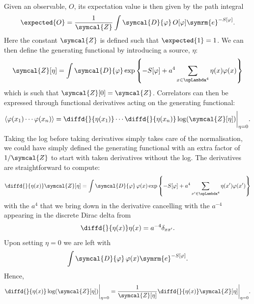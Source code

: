 \documentclass[fleqn]{NotesClass}
\newcommand{\e}{\symrm{e}}
\newcommand{\DL}[1]{\symcal{D}{#1}}
\DeclarePairedDelimiter{\correlator}{\langle}{\rangle}
\newcommand{\partitionFunction}{\symcal{Z}}
\newcommand{\lattice}[1][4]{\upLambda^{#1}}
\begin{document}
    Given an observable, \(O\), its expectation value is then given by the path integral
    \begin{equation}
        \expected{O} = \frac{1}{\partitionFunction} \int \DL{\varphi} \, O[\varphi] \e^{-S[\varphi]}.
    \end{equation}
    Here the constant \(\partitionFunction\) is defined such that \(\expected{1} = 1\).
    We can then define the generating functional by introducing a source, \(\eta\):
    \begin{equation}
        \partitionFunction[\eta] = \int \DL{\varphi} \exp\left\{ -S[\varphi] + a^4 \sum_{x\in\lattice} \eta(x)\varphi(x) \right\}
    \end{equation}
    which is such that \(\partitionFunction[0] = \partitionFunction\).
    Correlators can then be expressed through functional derivatives acting on the generating functional:
    \begin{equation}
        \correlator{\varphi(x_1) \dotsm \varphi(x_n)} = \diffd{}{\eta(x_1)} \dotsm \diffd{}{\eta(x_n)} \log(\partitionFunction[\eta])\bigg|_{\eta = 0}.
    \end{equation}
    Taking the log before taking derivatives simply takes care of the normalisation, we could have simply defined the generating functional with an extra factor of \(1/\partitionFunction\) to start with taken derivatives without the log.
    The derivatives are straightforward to compute:
    \begin{equation}
        \diffd{}{\eta(x)} \partitionFunction[\eta] = \int\DL{\varphi} \, \varphi(x) \exp\left\{ -S[\varphi] + a^4 \sum_{x'\in\lattice}\eta(x')\varphi(x') \right\}
    \end{equation}
    with the \(a^4\) that we bring down in the derivative cancelling with the \(a^{-4}\) appearing in the discrete Dirac delta from
    \begin{equation}
        \diffd{}{\eta(x)}\eta(x) = a^{-4}\delta_{xx'}.
    \end{equation}
    Upon setting \(\eta = 0\) we are left with
    \begin{equation}
        \int\DL{\varphi} \, \varphi(x) \e^{-S[\varphi]}.
    \end{equation}
    Hence,
    \begin{equation}
        \diffd{}{\eta(x)}\log(\partitionFunction[\eta])\bigg|_{\eta = 0} = \frac{1}{\partitionFunction[\eta]}\diffd{}{\eta(x)}\partitionFunction[\eta]\bigg|_{\eta = 0}.
    \end{equation}
    
\end{document}
